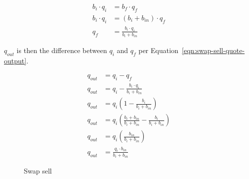 \documentclass[table, twocolumn]{article}
\begin{document}
\begin{align}\label{eqn:swap-sell-quote-final}
  b_i \cdot q_i &= b_f \cdot q_f \nonumber \\
  b_i \cdot q_i &= (b_i + b_{in}) \cdot q_f \nonumber \\
  q_f &= \frac{b_i \cdot q_i}{b_i + b_{in}}
\end{align}

$q_{out}$ is then the difference between $q_i$ and $q_f$ per
Equation~\ref{eqn:swap-sell-quote-output}.

\begin{align}\label{eqn:swap-sell-quote-output}
  q_{out} &= q_i - q_f \nonumber \\
  q_{out} &= q_i - \frac{b_i \cdot q_i}{b_i + b_{in}} \nonumber \\
  q_{out} &= q_i \left( 1 - \frac{b_i}{b_i + b_{in}} \right) \nonumber \\
  q_{out} &= q_i \left(
    \frac{b_i + b_{in}}{b_i + b_{in}} - \frac{b_i}{b_i + b_{in}}
  \right) \nonumber \\
  q_{out} &= q_i \left( \frac{b_{in}}{b_i + b_{in}} \right) \nonumber \\
  q_{out} &= \frac{q_i \cdot b_{in}}{b_i + b_{in}}
\end{align}

\begin{figure}[!htb]
	\centering
	
	\caption{Swap sell}\label{fig:swap-sell}
\end{figure}
\end{document}
